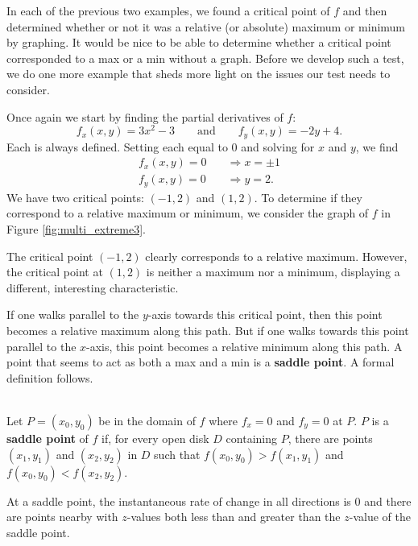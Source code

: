 In each of the previous two examples, we found a critical point of $f$ and then determined whether or not it was a relative (or absolute) maximum or minimum by graphing. It would be nice to be able to determine whether a critical point corresponded to a max or a min without a graph. Before we develop such a test, we do one more example that sheds more light on the issues our test needs to consider.\\

{Once again we start by finding the partial derivatives of $f$:
$$f_x(x,y) = 3x^2-3\qquad \text{and} \qquad f_y(x,y) = -2y+4.$$
Each is always defined. Setting each equal to 0 and solving for $x$ and $y$, we find
\begin{align*}
f_x(x,y) = 0 \quad &\Rightarrow x=\pm 1\\
f_y(x,y) = 0\quad &\Rightarrow y = 2.
\end{align*}
We have two critical points: $(-1,2)$ and $(1,2)$. To determine if they correspond to a relative maximum or minimum, we consider the graph of $f$ in Figure \ref{fig:multi_extreme3}.

The critical point $(-1,2)$ clearly corresponds to a relative maximum. However, the critical point at $(1,2)$ is neither a maximum nor a minimum, displaying a different, interesting characteristic. 

If one walks parallel to the $y$-axis towards this critical point, then this point becomes a relative maximum along this path. But if one walks towards this point parallel to the $x$-axis, this point becomes a relative minimum along this path. A point that seems to act as both a max and a min is a \textbf{saddle point}. A formal definition follows.
}\\

{Let $P=(x_0,y_0)$ be in the domain of $f$ where $f_x=0$ and $f_y=0$ at $P$. $P$ is a \textbf{saddle point} of $f$ if, for every open disk $D$ containing $P$, there are points $(x_1,y_1)$ and $(x_2,y_2)$ in $D$ such that $f(x_0,y_0)>f(x_1,y_1)$ and $f(x_0,y_0)<f(x_2,y_2)$.
}

At a saddle point, the instantaneous rate of change in all directions is 0 and there are points nearby with $z$-values both less than and greater than the $z$-value of the saddle point.

